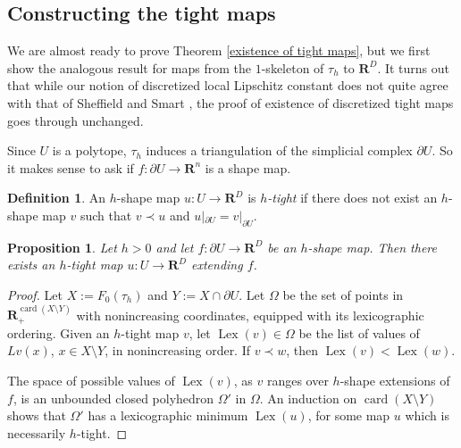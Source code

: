 \documentclass[reqno,11pt]{amsart}
\newcommand{\RR}{\mathbf{R}}
\DeclareMathOperator{\card}{card}
\DeclareMathOperator{\Lex}{Lex}
\newcommand{\dfn}[1]{\emph{#1}\index{#1}}
\newtheorem{proposition}[theorem]{Proposition}
\theoremstyle{definition}
\newtheorem{definition}[theorem]{Definition}
\numberwithin{equation}{section}
\begin{document}
\subsection{Constructing the tight maps}
We are almost ready to prove Theorem \ref{existence of tight maps}, but we first show the analogous result for maps from the $1$-skeleton of $\tau_h$ to $\RR^D$.
It turns out that while our notion of discretized local Lipschitz constant does not quite agree with that of Sheffield and Smart \cite[\S1.2]{Sheffield12}, the proof of existence of discretized tight maps \cite[Theorem 1.2]{Sheffield12} goes through unchanged.

Since $U$ is a polytope, $\tau_h$ induces a triangulation of the simplicial complex $\partial U$.
So it makes sense to ask if $f: \partial U \to \RR^n$ is a shape map.

\begin{definition}
An $h$-shape map $u: U \to \RR^D$ is \dfn{$h$-tight} if there does not exist an $h$-shape map $v$ such that $v \prec u$ and $u|_{\partial U} = v|_{\partial U}$.
\end{definition}

\begin{proposition}\label{discrete wellposedness}
Let $h > 0$ and let $f: \partial U \to \RR^D$ be an $h$-shape map.
Then there exists an $h$-tight map $u: U \to \RR^D$ extending $f$.
\end{proposition}
\begin{proof}
Let $X := F_0(\tau_h)$ and $Y := X \cap \partial U$.
Let $\Omega$ be the set of points in $\RR_+^{\card(X \setminus Y)}$ with nonincreasing coordinates, equipped with its lexicographic ordering.
Given an $h$-tight map $v$, let $\Lex(v) \in \Omega$ be the list of values of $Lv(x)$, $x \in X \setminus Y$, in nonincreasing order.
If $v \prec w$, then $\Lex(v) < \Lex(w)$.

The space of possible values of $\Lex(v)$, as $v$ ranges over $h$-shape extensions of $f$, is an unbounded closed polyhedron $\Omega'$ in $\Omega$.
An induction on $\card(X \setminus Y)$ shows that $\Omega'$ has a lexicographic minimum $\Lex(u)$, for some map $u$ which is necessarily $h$-tight.
\end{proof}
\end{document}
